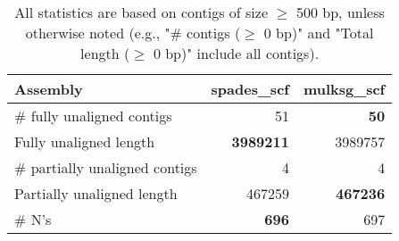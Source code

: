 \documentclass[12pt,a4paper]{article}
\begin{document}
\begin{table}[ht]
\begin{center}
\caption{All statistics are based on contigs of size $\geq$ 500 bp, unless otherwise noted (e.g., "\# contigs ($\geq$ 0 bp)" and "Total length ($\geq$ 0 bp)" include all contigs).}
\begin{tabular}{|l*{2}{|r}|}
\hline
Assembly & spades\_scf & mulksg\_scf \\ \hline
\# fully unaligned contigs & 51 & {\bf 50} \\ \hline
Fully unaligned length & {\bf 3989211} & 3989757 \\ \hline
\# partially unaligned contigs & 4 & 4 \\ \hline
Partially unaligned length & 467259 & {\bf 467236} \\ \hline
\# N's & {\bf 696} & 697 \\ \hline
\end{tabular}
\end{center}
\end{table}
\end{document}
